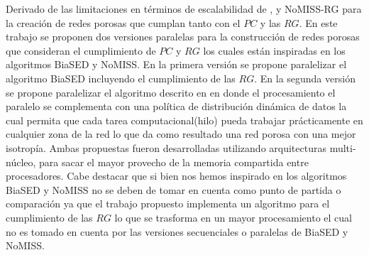 Derivado de las limitaciones en términos de escalabilidad de \cite{ref5}, \cite{ref17} y NoMISS-RG para la creación de redes porosas que cumplan tanto con el $PC$ y las $RG$. En este trabajo se proponen dos versiones paralelas para la construcción de redes porosas que consideran el cumplimiento de $PC$ y $RG$ los cuales están inspiradas en los algoritmos BiaSED y NoMISS. En la primera versión se propone paralelizar el algoritmo BiaSED incluyendo el cumplimiento de las $RG$. En la segunda versión se propone paralelizar el algoritmo descrito en \cite{ref17} en donde el procesamiento el paralelo se complementa con una política de distribución dinámica de datos la cual permita que cada tarea computacional(hilo) pueda trabajar prácticamente en cualquier zona de la red lo que da como resultado una red porosa con una mejor isotropía. Ambas propuestas fueron desarrolladas utilizando arquitecturas multi-núcleo, para sacar el mayor provecho de la memoria compartida entre procesadores. Cabe destacar que si bien nos hemos inspirado en los algoritmos  BiaSED y  NoMISS no se deben de tomar en cuenta como punto de partida o comparación ya que el trabajo propuesto implementa un algoritmo para el cumplimiento de las $RG$ lo que se trasforma en un mayor procesamiento el cual no es tomado en cuenta por las versiones secuenciales o paralelas de BiaSED y NoMISS.






